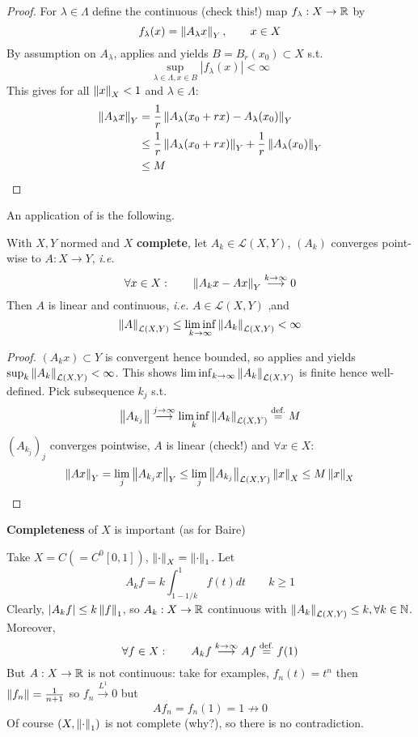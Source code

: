 \documentclass{article}
\begin{document}
\begin{proof}
For $\lambda \in \Lambda$ define the continuous (check this!) map $f_\lambda: X \to \mathbb{R}$ by  
$$
f_{\lambda}(x) = \left\|{A_{\lambda}x}\right\|_Y, \qquad x\in X
$$  
By assumption on $A_\lambda$,  applies and yields $B=B_r(x_0) \subset X$ s.t.  
$$
\sup_{\lambda \in \Lambda, x\in B} |f_{\lambda}(x)| < \infty
$$  
This gives for all $\left\|{x}\right\|_X<1$ and $\lambda \in \Lambda$:
\begin{align*}
    \left\|{A_\lambda x}\right\|_Y &= \frac{1}{r} \left\|{A_\lambda(x_0+rx)-A_\lambda(x_0)}\right\|_Y \\
    &\leq \frac{1}{r} \left\|{A_\lambda(x_0+rx)}\right\|_Y + \frac{1}{r} \left\|{A_\lambda(x_0)}\right\|_Y \\
    &\leq M
\end{align*}
\end{proof}  

An application of  is the following.  

\begin{proposition}
    With $X,Y$ normed and $X$ \textbf{complete}, let $A_k \in \mathcal{L}(X,Y)$, $(A_k)$ converges point-wise to $A: X\to Y$, \textit{i.e.}  
    $$
    \forall x \in X: \qquad \left\|{A_k x - Ax}\right\|_Y \overset{k\to \infty}{\longrightarrow} 0 
    $$
    Then $A$ is linear and continuous, \textit{i.e.} $A \in \mathcal{L}(X,Y)$ ,and  
    $$
    \left\|{A}\right\|_{\mathcal{L}(X,Y)} \leq \liminf_{k \to \infty} \left\|{A_k}\right\|_{\mathcal{L}(X,Y)} <\infty
    $$
\end{proposition}

\begin{proof}
    $(A_k x)\subset Y$ is convergent hence bounded, so  applies and yields $\sup_k \left\|{A_k}\right\|_{\mathcal{L}(X,Y)} < \infty$. This shows $\liminf_{k \to \infty} \left\|{A_k}\right\|_{\mathcal{L}(X,Y)}$ is finite hence well-defined. Pick subsequence $k_j$ s.t. 
    $$\left\|{A_{k_j}}\right\|\overset{j \to \infty}{\longrightarrow} \liminf_k \left\|{A_k}\right\|_{\mathcal{L}(X,Y)} \stackrel{\text{def.}}{=} M$$
    $(A_{k_j})_j$ converges pointwise, $A$ is linear (check!) and $\forall x \in X$:  
    $$
    \left\|{Ax}\right\|_Y = \lim_{j} \left\|{A_{k_j}x}\right\|_Y \leq \lim_j \left\|{A_{k_j}}\right\|_{\mathcal{L}(X,Y)} \left\|{x}\right\|_X \leq M \left\|{x}\right\|_X
    $$
\end{proof}

\begin{remark}
    \textbf{Completeness} of $X$ is important (as for Baire)  
    
    Take $X=C(=C^0[0,1])$, $\left\|{\cdot}\right\|_X=\left\|{\cdot}\right\|_1$. Let  
    $$
    A_k f = k\int_{1-1/k}^1 f(t) dt \qquad k\geq 1
    $$  
    Clearly, $|A_k f|\leq k \left\|{f}\right\|_1$, so $A_k: X\to \mathbb{R}$ continuous with $\left\|{A_k}\right\|_{\mathcal{L}(X,Y)} \leq k, \forall k \in \mathbb{N}$. Moreover,  
    $$
    \forall f \in X: \qquad A_k f \overset{k\to \infty}{\longrightarrow} Af \stackrel{\text{def.}}{=} f(1)
    $$
    But $A:X\to \mathbb{R}$ is not continuous: take for examples, $f_n(t)=t^n$ then $\left\|{f_n}\right\|=\frac{1}{n+1}$ so $f_n \overset{L^1}{\longrightarrow} 0 $ but  
    $$
    Af_n = f_n(1) = 1 \nrightarrow 0
    $$  
    Of course $(X, \left\|{\cdot}\right\|_1)$ is not complete (why?), so there is no contradiction.  
\end{remark}
\end{document}
